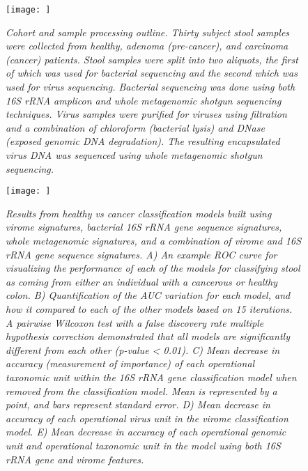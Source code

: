 \documentclass[12pt,]{article}
\begin{document}
\begin{figure}[htbp]
\centering
\texttt{[image: ]}
\caption{\emph{Cohort and sample processing outline. Thirty subject
stool samples were collected from healthy, adenoma (pre-cancer), and
carcinoma (cancer) patients. Stool samples were split into two aliquots,
the first of which was used for bacterial sequencing and the second
which was used for virus sequencing. Bacterial sequencing was done using
both 16S rRNA amplicon and whole metagenomic shotgun sequencing
techniques. Virus samples were purified for viruses using filtration and
a combination of chloroform (bacterial lysis) and DNase (exposed genomic
DNA degradation). The resulting encapsulated virus DNA was sequenced
using whole metagenomic shotgun sequencing.} \label{sampleproc}}
\end{figure}

\newpage

\begin{figure}[htbp]
\centering
\texttt{[image: ]}
\caption{\emph{Results from healthy vs cancer classification models
built using virome signatures, bacterial 16S rRNA gene sequence
signatures, whole metagenomic signatures, and a combination of virome
and 16S rRNA gene sequence signatures. A) An example ROC curve for
visualizing the performance of each of the models for classifying stool
as coming from either an individual with a cancerous or healthy colon.
B) Quantification of the AUC variation for each model, and how it
compared to each of the other models based on 15 iterations. A pairwise
Wilcoxon test with a false discovery rate multiple hypothesis correction
demonstrated that all models are significantly different from each other
(p-value \textless{} 0.01). C) Mean decrease in accuracy (measurement of
importance) of each operational taxonomic unit within the 16S rRNA gene
classification model when removed from the classification model. Mean is
represented by a point, and bars represent standard error. D) Mean
decrease in accuracy of each operational virus unit in the virome
classification model. E) Mean decrease in accuracy of each operational
genomic unit and operational taxonomic unit in the model using both 16S
rRNA gene and virome features.}\label{predmodel}}
\end{figure}

\newpage
\end{document}
